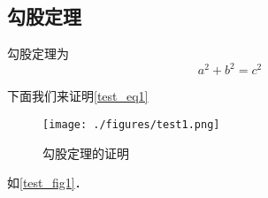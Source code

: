 
\subsection{勾股定理}
勾股定理为
\begin{equation}
a^2 + b^2 = c^2
\end{equation}

下面我们来证明\autoref{test_eq1}

\begin{figure}[ht]
\centering
\texttt{[image: ./figures/test1.png]}
\caption{勾股定理的证明} \label{test_fig1}
\end{figure}

如\autoref{test_fig1}． 